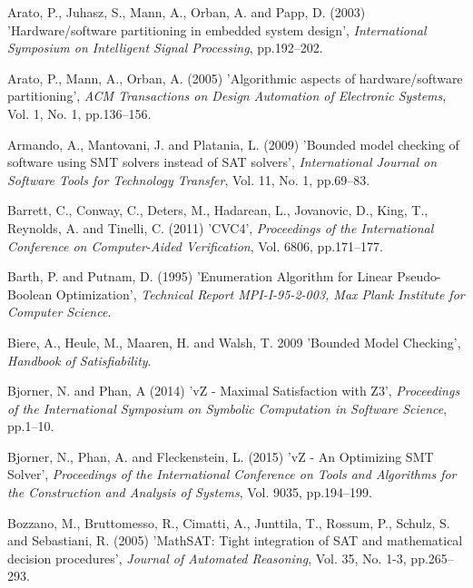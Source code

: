 \documentclass{doublecol-new}
\theoremstyle{TH}{
\newtheorem{lemma}{Lemma}
\newtheorem{theorem}[lemma]{Theorem}
\newtheorem{corrolary}[lemma]{Corrolary}
\newtheorem{conjecture}[lemma]{Conjecture}
\newtheorem{proposition}[lemma]{Proposition}
\newtheorem{claim}[lemma]{Claim}
\newtheorem{stheorem}[lemma]{Wrong Theorem}
\newtheorem{algorithm}{Algorithm}
}
\theoremstyle{THrm}{
\newtheorem{definition}{Definition}[section]
\newtheorem{question}{Question}[section]
\newtheorem{remark}{Remark}
\newtheorem{scheme}{Scheme}
}
\theoremstyle{THhit}{
\newtheorem{case}{Case}[section]
}
\begin{document}
\begin{thebibliography}{10}

Arato, P., Juhasz, S., Mann, A., Orban, A. and Papp, D. (2003) 'Hardware/software partitioning in embedded system design', {\it International Symposium on Intelligent Signal Processing}, pp.192--202.

Arato, P., Mann, A., Orban, A. (2005) 'Algorithmic aspects of hardware/software partitioning', {\it ACM Transactions on Design Automation of Electronic Systems}, Vol. 1, No. 1, pp.136--156.

Armando, A., Mantovani, J. and Platania, L. (2009) 'Bounded model checking of software using SMT solvers instead of SAT solvers', {\it International Journal on Software Tools for Technology Transfer}, Vol. 11, No. 1, pp.69--83.

Barrett, C., Conway, C., Deters, M., Hadarean, L., Jovanovic, D., King, T., Reynolds, A. and Tinelli, C. (2011) 'CVC4', {\it Proceedings of the International Conference on Computer-Aided Verification}, Vol. 6806, pp.171--177.

Barth, P. and Putnam, D. (1995) 'Enumeration Algorithm for Linear Pseudo-Boolean Optimization', {\it Technical Report MPI-I-95-2-003, Max Plank Institute for Computer Science}.

Biere, A., Heule, M., Maaren, H. and Walsh, T. {2009} 'Bounded Model Checking', {\it Handbook of Satisfiability}.

Bjorner, N. and Phan, A (2014) 'vZ - Maximal Satisfaction with Z3', {\it Proceedings of the International Symposium on Symbolic Computation in Software Science}, pp.1--10.

Bjorner, N., Phan, A. and Fleckenstein, L. (2015) 'vZ - An Optimizing SMT Solver', {\it Proceedings of the International Conference on Tools and Algorithms for the Construction and Analysis of Systems}, Vol. 9035, pp.194--199.

Bozzano, M., Bruttomesso, R., Cimatti, A., Junttila, T., Rossum, P., Schulz, S. and Sebastiani, R. (2005) 'MathSAT: Tight integration of SAT and mathematical decision procedures', {\it Journal of Automated Reasoning}, Vol. 35, No. 1-3, pp.265--293.


\end{thebibliography}
\end{document}
